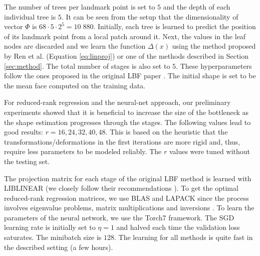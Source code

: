 \documentclass{article}
\begin{document}
		The number of trees per landmark point is set to $5$ and the depth of each individual tree is $5$.
		It can be seen from the setup that the dimensionality of vector $\Phi$ is $68\cdot 5\cdot 2^5=10\;880$.
		Initially, each tree is learned to predict the position of its landmark point from a local patch around it.
		Next, the values in the leaf nodes are discarded and we learn the function $\Delta(x)$ using the method proposed by Ren et al. \cite{lbf} (Equation \eqref{eq:linproj}) or one of the methods described in Section \ref{sec:method}.
		The total number of stages is also set to $5$.
		These hyperparameters follow the ones proposed in the original LBF paper \cite{lbf}.
		The initial shape is set to be the mean face computed on the training data.

		For reduced-rank regression and the neural-net approach, our preliminary experiments showed that it is beneficial to increase the size of the bottleneck as the shape estimation progresses through the stages.
		The following values lead to good results: $r=16, 24, 32, 40, 48$.
		This is based on the heuristic that the transformations/deformations in the first iterations are more rigid and, thus, require less parameters to be modeled reliably.
		The $r$ values were tuned without the testing set.

		The projection matrix for each stage of the original LBF method is learned with LIBLINEAR \cite{liblinear}
		(we closely follow their recommendations \cite{lbf}).
		To get the optimal reduced-rank regression matrices, we use BLAS and LAPACK since the process involves eigenvalue problems, matrix multiplications and inversions \cite{rrr}.
		To learn the parameters of the neural network, we use the Torch7 framework.
		The SGD learning rate is initially set to $\eta=1$ and halved each time the validation loss saturates.
		The minibatch size is $128$.
		The learning for all methods is quite fast in the described setting (a few hours).
\end{document}
